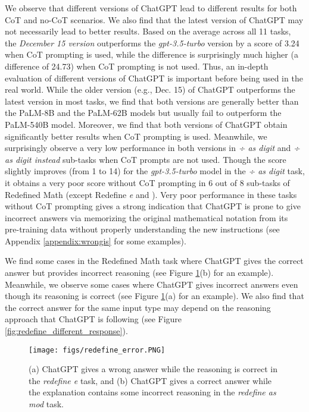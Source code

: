\documentclass[11pt]{article}
\begin{document}
We observe that different versions of ChatGPT lead to different results for both CoT and no-CoT scenarios. We also find that the latest version of ChatGPT may not necessarily lead to better results. Based on the average across all 11 tasks, the \textit{December 15 version} outperforms the \textit{gpt-3.5-turbo} version by a score of 3.24 when CoT prompting is used, while the difference is surprisingly much higher (a difference of 24.73) when CoT prompting is not used. Thus, an in-depth evaluation of different versions of ChatGPT is important before being used in the real world. While the older version (e.g., Dec. 15) of ChatGPT outperforms the latest version in most tasks, we find that both versions are generally better than the PaLM-8B and the PaLM-62B models but usually fail to outperform the PaLM-540B model. Moreover, we find that both versions of ChatGPT obtain significantly better results when CoT prompting is used. Meanwhile, we surprisingly observe a very low performance in both versions in \textit{÷ as digit} and \textit{÷ as digit instead} sub-tasks when CoT prompts are not used. Though the score slightly improves (from 1 to 14) for the \textit{gpt-3.5-turbo} model in the \textit{÷ as digit} task, it obtains a very poor score without CoT prompting in 6 out of 8 sub-tasks of Redefined Math (except Redefine \textit{e} and ). Very poor performance in these tasks without CoT prompting gives a strong indication that ChatGPT is prone to give incorrect answers via memorizing the original mathematical notation from its pre-training data without properly understanding the new instructions (see Appendix \ref{appendix:wrongis} for some examples). 

We find some cases in the Redefined Math task where ChatGPT gives the correct answer but provides incorrect reasoning (see Figure \ref{fig:redefine_error}(b) for an example). Meanwhile, we observe some cases where ChatGPT gives incorrect answers even though its reasoning is correct (see Figure \ref{fig:redefine_error}(a) for an example). We also find that the correct answer for the same input type may depend on the reasoning approach that ChatGPT is following (see Figure \ref{fig:redefine_different_response}). 



\begin{figure}[t!]

\begin{center}
\texttt{[image: figs/redefine\_error.PNG]}
\caption[overview]{
\small{(a) ChatGPT gives a wrong answer while the reasoning is correct in the \textit{redefine e} task, and (b) ChatGPT gives a correct answer while the explanation contains some incorrect reasoning in the \textit{redefine  as mod} task.} }
\label{fig:redefine_error}
\end{center}
\vspace{-.2cm}
\end{figure}
\end{document}
